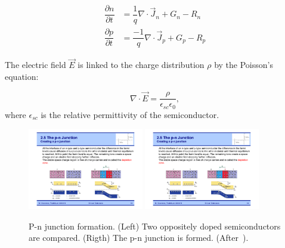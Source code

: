 \begin{align}
\dfrac{\partial n}{\partial t}&=\dfrac{1}{q}\nabla\cdot\vec{J}_n+G_n-R_n\label{eq:nCont}\\
\dfrac{\partial p}{\partial t}&=\dfrac{-1}{q}\nabla\cdot\vec{J}_p+G_p-R_p\label{eq:pCont}
\end{align}

The electric field $\vec{E}$ is linked to the charge distribution $\rho$ by the Poisson's equation:

\begin{equation}
\nabla\cdot\vec{E}=\dfrac{\rho}{\epsilon_{sc}\epsilon_{0}},
\label{eq:Poisson}
\end{equation}
where $\epsilon_{sc}$ is the relative permittivity of the semiconductor.

\begin{figure}[htbp]
   \centering
   \includegraphics[width=0.45\textwidth]{p_close_to_n.pdf} 
   \includegraphics[width=0.45\textwidth]{pn_junction.pdf} 
   \caption{\label{fig:pnJunction}P-n junction formation. (Left) Two oppositely doped semiconductors 
   are compared. (Rigth) The p-n junction is formed. (After~\cite{Krammer}).}
\end{figure}



